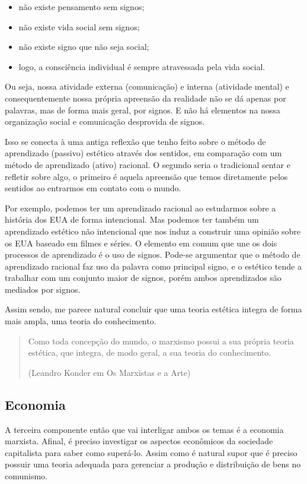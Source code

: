 \begin{itemize}
    \item não existe pensamento sem signos;
    \item não existe vida social sem signos;
    \item não existe signo que não seja social;
    \item logo, a consciência individual é sempre atravessada pela vida social.
\end{itemize}
Ou seja, nossa atividade externa (comunicação) e interna (atividade mental) e consequentemente nossa própria apreensão da realidade não se dá apenas por palavras, mas de forma mais geral, por signos. E não há elementos na nossa organização social e comunicação desprovida de signos.

Isso se conecta à uma antiga reflexão que tenho feito sobre o método de aprendizado (passivo) estético através dos sentidos, em comparação com um método de aprendizado (ativo) racional. O segundo seria o tradicional sentar e refletir sobre algo, o primeiro é aquela apreensão que temos diretamente pelos sentidos ao entrarmos em contato com o mundo. 

Por exemplo, podemos ter um aprendizado racional ao estudarmos sobre a história dos EUA de forma intencional. Mas podemos ter também um aprendizado estético não intencional que nos induz a construir uma opinião sobre os EUA baseado em filmes  e séries. O elemento em comum que une os dois processos de aprendizado é o uso de signos. Pode-se argumentar que o método de aprendizado racional faz uso da palavra como principal signo, e o estético tende a trabalhar com um conjunto maior de signos, porém ambos aprendizados são mediados por signos.

Assim sendo, me parece natural concluir que uma teoria estética integra de forma mais ampla, uma teoria do conhecimento.

\begin{quote}
Como toda concepção do mundo, o marxismo possui a sua própria teoria estética, que integra, de modo geral, a sua teoria do conhecimento.

(Leandro Konder em Os Marxistas e a Arte)
\end{quote}

\subsection{Economia}

A terceira componente então que vai interligar ambos os temas é a economia marxista. Afinal, é preciso investigar os aspectos econômicos da sociedade capitalista para saber como superá-lo. Assim como é natural supor que é preciso possuir uma teoria adequada para gerenciar a produção e distribuição de bens no comunismo.

